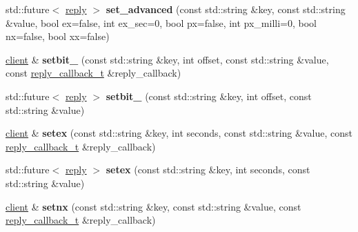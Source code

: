 \begin{DoxyCompactItemize}
\item 
\mbox{\label{classcpp__redis_1_1client_a208688fdc336009701256722ef7e2a2b}} 
std\+::future$<$ \mbox{\hyperlink{classcpp__redis_1_1reply}{reply}} $>$ {\bfseries set\+\_\+advanced} (const std\+::string \&key, const std\+::string \&value, bool ex=false, int ex\+\_\+sec=0, bool px=false, int px\+\_\+milli=0, bool nx=false, bool xx=false)
\item 
\mbox{\label{classcpp__redis_1_1client_a17ecd647ae2e9f11e331d1254a21e0d3}} 
\mbox{\hyperlink{classcpp__redis_1_1client}{client}} \& {\bfseries setbit\+\_\+} (const std\+::string \&key, int offset, const std\+::string \&value, const \mbox{\hyperlink{classcpp__redis_1_1client_af7a65eb21aa25230bfbb0b0203c4fc04}{reply\+\_\+callback\+\_\+t}} \&reply\+\_\+callback)
\item 
\mbox{\label{classcpp__redis_1_1client_abbf3233f6c395c5d4bdf7810c80e6c05}} 
std\+::future$<$ \mbox{\hyperlink{classcpp__redis_1_1reply}{reply}} $>$ {\bfseries setbit\+\_\+} (const std\+::string \&key, int offset, const std\+::string \&value)
\item 
\mbox{\label{classcpp__redis_1_1client_a9c82e27a54dc86febda83f34142ea402}} 
\mbox{\hyperlink{classcpp__redis_1_1client}{client}} \& {\bfseries setex} (const std\+::string \&key, int seconds, const std\+::string \&value, const \mbox{\hyperlink{classcpp__redis_1_1client_af7a65eb21aa25230bfbb0b0203c4fc04}{reply\+\_\+callback\+\_\+t}} \&reply\+\_\+callback)
\item 
\mbox{\label{classcpp__redis_1_1client_a14f1f1c9f50437585a8e758d1a004a67}} 
std\+::future$<$ \mbox{\hyperlink{classcpp__redis_1_1reply}{reply}} $>$ {\bfseries setex} (const std\+::string \&key, int seconds, const std\+::string \&value)
\item 
\mbox{\label{classcpp__redis_1_1client_ad701f8b9e3769986b1af97049b52de83}} 
\mbox{\hyperlink{classcpp__redis_1_1client}{client}} \& {\bfseries setnx} (const std\+::string \&key, const std\+::string \&value, const \mbox{\hyperlink{classcpp__redis_1_1client_af7a65eb21aa25230bfbb0b0203c4fc04}{reply\+\_\+callback\+\_\+t}} \&reply\+\_\+callback)
\item 

\end{DoxyCompactItemize}
